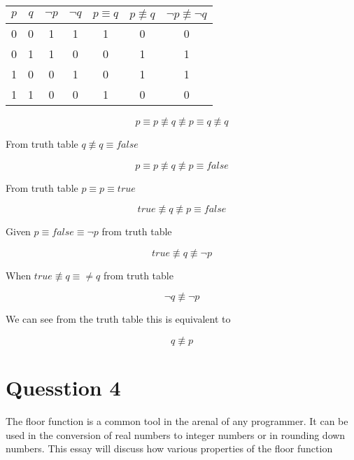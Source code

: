 \documentclass[10pt,a4paper]{article}
\begin{document}
\begin{tabular}{|c|c|c|c|c|c|c|}
 \hline
 $p$ & $q$ & $\neg p$& $\neg q$& $p\equiv q$ & $p \not\equiv q$ &$\neg p \not\equiv \neg q$\\
 \hline
 0 &0&1&1&1&0&0  \\
 0 &1&1&0&0&1&1  \\
 1 &0&0&1&0&1&1  \\
 1 &1&0&0&1&0&0  \\
 \hline
\end{tabular}


\begin{equation}
 p\equiv p \not \equiv q \not\equiv p \equiv q \not \equiv q
\end{equation}

From truth table $q \not\equiv q \equiv false$

\begin{equation}
 p\equiv p \not \equiv q \not\equiv p \equiv false
\end{equation}

From truth table $p \equiv p \equiv true$

\begin{equation}
true \not \equiv q \not\equiv p \equiv false
\end{equation}

Given $p \equiv false \equiv \neg p$ from truth table

\begin{equation}
true \not \equiv q \not\equiv \neg p
\end{equation}

When $true \not\equiv q \equiv \neq q$ from truth table


\begin{equation}
\neg q \not\equiv \neg p
\end{equation}

We can see from the truth table this is equivalent to


\begin{equation}
q \not\equiv p
\end{equation}




\section{Quesstion 4}

The floor function is a common tool in the arenal of any programmer. It can be used in the conversion of real numbers to integer numbers or in rounding down numbers. This essay will discuss how various properties of the floor function
\end{document}
